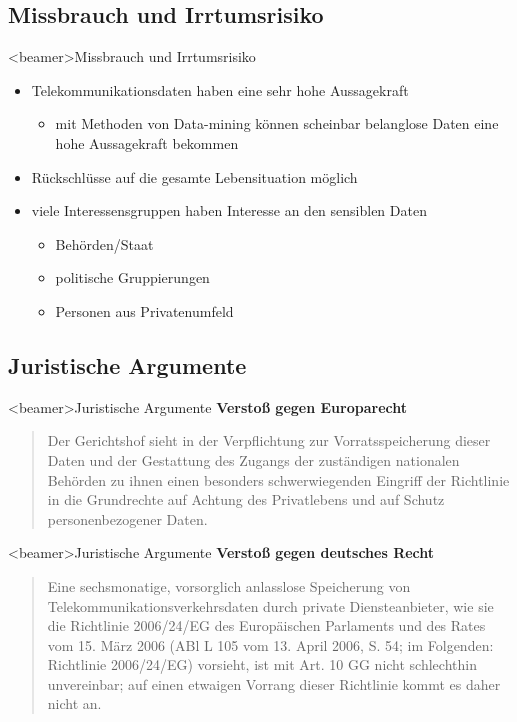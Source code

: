   \subsection*{Missbrauch und Irrtumsrisiko}
    \begin{frame}<beamer>{Missbrauch und Irrtumsrisiko}
      \begin{itemize}
        \item
          Telekommunikationsdaten haben eine sehr hohe Aussagekraft
      \begin{itemize}
         \item mit Methoden von Data-mining können scheinbar belanglose Daten eine hohe Aussagekraft bekommen
      \end{itemize}
        \item
          Rückschlüsse auf die gesamte Lebensituation möglich
 \item viele Interessensgruppen haben Interesse an den sensiblen Daten
          \begin{itemize}
         \item Behörden/Staat
         \item politische Gruppierungen
         \item Personen aus Privatenumfeld
      \end{itemize}
 
      \end{itemize}
    \end{frame}

  \subsection*{Juristische Argumente}
    \begin{frame}<beamer>{Juristische Argumente}
      \textbf{Verstoß gegen Europarecht}
      \begin{quote}
        Der Gerichtshof sieht in der Verpflichtung zur Vorratsspeicherung dieser Daten und der Gestattung des Zugangs der zuständigen nationalen Behörden zu ihnen einen besonders schwerwiegenden Eingriff der Richtlinie in die Grundrechte auf Achtung des Privatlebens und auf Schutz personenbezogener Daten.

      \end{quote}
    \end{frame}

    \begin{frame}<beamer>{Juristische Argumente}
      \textbf{Verstoß gegen deutsches Recht}
      \begin{quote}
        Eine sechsmonatige, vorsorglich anlasslose Speicherung von Telekommunikationsverkehrsdaten durch private Diensteanbieter, wie sie die Richtlinie 2006/24/EG des Europäischen Parlaments und des Rates vom 15. März 2006 (ABl L 105 vom 13. April 2006, S. 54; im Folgenden: Richtlinie 2006/24/EG) vorsieht, ist mit Art. 10 GG nicht schlechthin unvereinbar; auf einen etwaigen Vorrang dieser Richtlinie kommt es daher nicht an.

      \end{quote}
    \end{frame}

